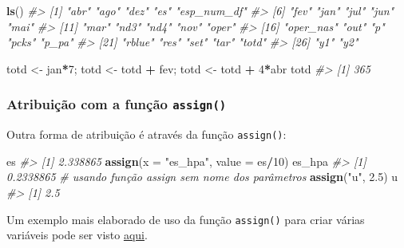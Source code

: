 \documentclass[]{book}
\newenvironment{Shaded}{\begin{snugshade}}{\end{snugshade}}
\newcommand{\KeywordTok}[1]{\textcolor[rgb]{0.13,0.29,0.53}{\textbf{#1}}}
\newcommand{\DataTypeTok}[1]{\textcolor[rgb]{0.13,0.29,0.53}{#1}}
\newcommand{\DecValTok}[1]{\textcolor[rgb]{0.00,0.00,0.81}{#1}}
\newcommand{\FloatTok}[1]{\textcolor[rgb]{0.00,0.00,0.81}{#1}}
\newcommand{\StringTok}[1]{\textcolor[rgb]{0.31,0.60,0.02}{#1}}
\newcommand{\CommentTok}[1]{\textcolor[rgb]{0.56,0.35,0.01}{\textit{#1}}}
\newcommand{\OperatorTok}[1]{\textcolor[rgb]{0.81,0.36,0.00}{\textbf{#1}}}
\newcommand{\NormalTok}[1]{#1}
\begin{document}
\begin{Shaded}
\begin{Highlighting}[]
\KeywordTok{ls}\NormalTok{()}
\CommentTok{#>  [1] "abr"        "ago"        "dez"        "es"         "esp_num_df"}
\CommentTok{#>  [6] "fev"        "jan"        "jul"        "jun"        "mai"       }
\CommentTok{#> [11] "mar"        "nd3"        "nd4"        "nov"        "oper"      }
\CommentTok{#> [16] "oper_nas"   "out"        "p"          "pcks"       "p_pa"      }
\CommentTok{#> [21] "rblue"      "res"        "set"        "tar"        "totd"      }
\CommentTok{#> [26] "y1"         "y2"}
\end{Highlighting}
\end{Shaded}

\begin{Shaded}
\begin{Highlighting}[]
\NormalTok{totd <-}\StringTok{ }\NormalTok{jan}\OperatorTok{*}\DecValTok{7}\NormalTok{; totd <-}\StringTok{ }\NormalTok{totd }\OperatorTok{+}\StringTok{ }\NormalTok{fev; totd <-}\StringTok{ }\NormalTok{totd }\OperatorTok{+}\StringTok{ }\DecValTok{4}\OperatorTok{*}\NormalTok{abr}
\NormalTok{totd}
\CommentTok{#> [1] 365}
\end{Highlighting}
\end{Shaded}

\subsubsection{\texorpdfstring{Atribuição com a função
\texttt{assign()}}{Atribuição com a função assign()}}\label{atribuicao-com-a-funcao-assign}

Outra forma de atribuição é através da função \texttt{assign()}:

\begin{Shaded}
\begin{Highlighting}[]
\NormalTok{es}
\CommentTok{#> [1] 2.338865}
\KeywordTok{assign}\NormalTok{(}\DataTypeTok{x =} \StringTok{"es_hpa"}\NormalTok{, }\DataTypeTok{value =}\NormalTok{ es}\OperatorTok{/}\DecValTok{10}\NormalTok{)}
\NormalTok{es_hpa}
\CommentTok{#> [1] 0.2338865}
\CommentTok{# usando função assign sem nome dos parâmetros}
\KeywordTok{assign}\NormalTok{(}\StringTok{"u"}\NormalTok{, }\FloatTok{2.5}\NormalTok{)}
\NormalTok{u}
\CommentTok{#> [1] 2.5}
\end{Highlighting}
\end{Shaded}

Um exemplo mais elaborado de uso da função \texttt{assign()} para criar
várias variáveis pode ser visto
\href{https://gist.github.com/lhmet/d28856ed16690bb45d5be36ea4f5d458\#file-assign-ex-rmd}{aqui}.
\end{document}
